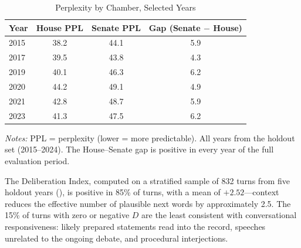 \documentclass[12pt]{article}
\newcommand{\DI}{\mathit{D}}
\begin{document}
\begin{table}[H]
\centering
\caption{Perplexity by Chamber, Selected Years}
\label{tab:perplexity}
\begin{threeparttable}
\begin{tabular}{lccc}
\toprule
Year & House PPL & Senate PPL & Gap (Senate $-$ House) \\
\midrule
2015 & 38.2 & 44.1 & 5.9 \\
2017 & 39.5 & 43.8 & 4.3 \\
2019 & 40.1 & 46.3 & 6.2 \\
2020 & 44.2 & 49.1 & 4.9 \\
2021 & 42.8 & 48.7 & 5.9 \\
2023 & 41.3 & 47.5 & 6.2 \\
\bottomrule
\end{tabular}
\begin{tablenotes}[flushleft]
\small
\item \textit{Notes:} PPL = perplexity (lower = more predictable). All years from the holdout set (2015--2024). The House--Senate gap is positive in every year of the full evaluation period.
\end{tablenotes}
\end{threeparttable}
\end{table}

The Deliberation Index, computed on a stratified sample of 832 turns from five holdout years (), is positive in 85\% of turns, with a mean of $+2.52$---context reduces the effective number of plausible next words by approximately 2.5. The 15\% of turns with zero or negative $\DI$ are the least consistent with conversational responsiveness: likely prepared statements read into the record, speeches unrelated to the ongoing debate, and procedural interjections.
\end{document}
